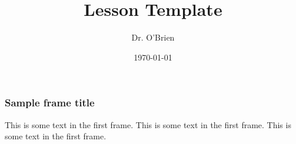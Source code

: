 \documentclass{beamer}
\title{Lesson Template}
\author{Dr. O'Brien}
\institute{Herbert H. Lehman High School}
\date{\today}
\begin{document}
\frame{\titlepage}

\begin{frame}
\frametitle{Sample frame title}
This is some text in the first frame. This is some text in the first frame. This is some text in the first frame.
\end{frame}
\end{document}
